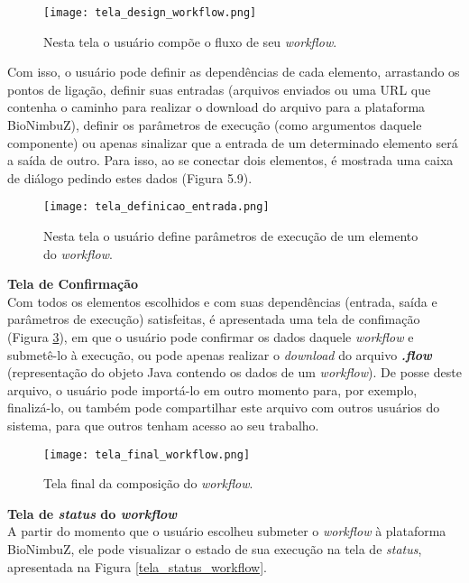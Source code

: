 \begin{figure}[H]
	\centering
	\texttt{[image: tela\_design\_workflow.png]}
	\caption{Nesta tela o usuário compõe o fluxo de seu \textit{workflow}.}
	\label{fig:tela_design_workflow}
\end{figure}

Com isso, o usuário pode definir as dependências de cada elemento, arrastando os pontos de ligação, definir suas entradas (arquivos enviados ou uma URL que contenha o caminho para realizar o download do arquivo para a plataforma BioNimbuZ), definir os parâmetros de execução (como argumentos daquele componente) ou apenas sinalizar que a entrada de um determinado elemento será a saída de outro. Para isso, ao se conectar dois elementos, é mostrada uma caixa de diálogo pedindo estes dados (Figura 5.9).

\begin{figure}[H]
	\centering
	\texttt{[image: tela\_definicao\_entrada.png]}
	\caption{Nesta tela o usuário define parâmetros de execução de um elemento do \textit{workflow}.}
	\label{fig:tela_definicao_entrada}
\end{figure}

\noindent
\textbf{Tela de Confirmação} \\

\noindent
Com todos os elementos escolhidos e com suas dependências (entrada, saída e parâmetros de execução) satisfeitas, é apresentada uma tela de confimação (Figura \ref{fig:tela_final_workflow}), em que o usuário pode confirmar os dados daquele \textit{workflow} e submetê-lo à execução, ou pode apenas realizar o \textit{download} do arquivo \textbf{\textit{.flow}} (representação do objeto Java contendo os dados de um \textit{workflow}). De posse deste arquivo, o usuário pode importá-lo em outro momento para, por exemplo, finalizá-lo, ou também pode compartilhar este arquivo com outros usuários do sistema, para que outros tenham acesso ao seu trabalho.

\begin{figure}[H]
	\centering
	\texttt{[image: tela\_final\_workflow.png]}
	\caption{Tela final da composição do \textit{workflow}.}
	\label{fig:tela_final_workflow}
\end{figure}

\noindent
\textbf{Tela de \textit{status} do \textit{workflow}} \\

\noindent
A partir do momento que o usuário escolheu submeter o \textit{workflow} à plataforma BioNimbuZ, ele pode visualizar o estado de sua execução na tela de \textit{status}, apresentada na Figura \ref{tela_status_workflow}. 

